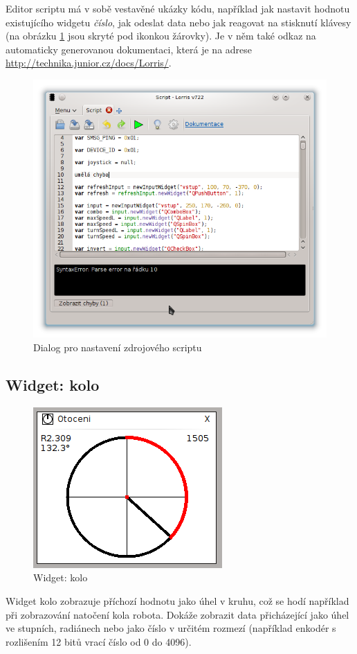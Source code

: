\documentclass[12pt, a4paper, oneside]{article}
\newcommand{\It}{\textit}  %
\begin{document}
Editor scriptu má v sobě vestavěné ukázky kódu, například jak nastavit hodnotu existujícího widgetu \It{číslo}, jak odeslat data nebo jak reagovat na stisknutí klávesy (na obrázku \ref{script_src} jsou skryté pod ikonkou žárovky). Je v něm také odkaz na automaticky generovanou dokumentaci, která je na adrese \url{http://technika.junior.cz/docs/Lorris/}.
\begin{figure}[h]
\begin{center}
\includegraphics[width=\textwidth]{img/w_script_src.png}
\caption{Dialog pro nastavení zdrojového scriptu}
\label{script_src}
\end{center}
\end{figure}

\subsection{Widget: kolo}
\begin{figure}[H]
\begin{center}
\includegraphics[scale=0.8]{img/w_circle.png}
\caption{Widget: kolo}
\end{center}
\end{figure}
Widget kolo zobrazuje příchozí hodnotu jako úhel v kruhu, což se hodí například při zobrazování natočení kola robota. Dokáže zobrazit data přicházející jako úhel ve stupních, radiánech nebo jako číslo v určitém rozmezí (například enkodér s rozlišením 12 bitů vrací číslo od 0 do 4096).
\end{document}
